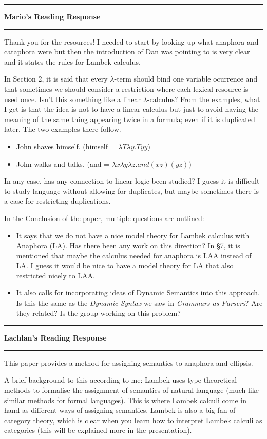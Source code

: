 \documentclass{amsart}
\newcommand{\iam}[1]{
  \vspace{0.25em}
  \hrule
  \vspace{0.25em}
  \textbf{{#1}'s Reading Response}
  \vspace{0.25em}
  \hrule
  \vspace{1em}
}
\begin{document}
\iam{Mario}
Thank you for the resources! I needed to start by looking up what
anaphora and cataphora were but then the introduction of
\cite{PentusGrammars} Dan was pointing to is very clear and it
states the rules for Lambek calculus.

In Section 2, it is said that every $\lambda\mbox{-term}$ should bind one variable
ocurrence and that sometimes we should consider a restriction where
each lexical resource is used once. Isn't this something like a linear
$\lambda\mbox{-calculus}$? From the examples, what I get is that the idea is
not to have a linear calculus but just to avoid having the meaning of
the same thing appearing twice in a formula; even if it is duplicated
later. The two examples there follow.

\begin{itemize}
\item John shaves himself. (himself = $\lambda T \lambda y. T y y$)
\item John walks and talks. (and = $\lambda x \lambda y \lambda z . and(xz)(yz)$)
\end{itemize}

In any case, has any connection to linear logic been studied?  I guess
it is difficult to study language without allowing for duplicates, but
maybe sometimes there is a case for restricting duplications.

In the Conclusion of the paper, multiple questions are outlined:

\begin{itemize}
\item It says that we do not have a nice model theory
  for Lambek calculus with Anaphora (LA).  Has there been any work on
  this direction?  In \S 7, it is mentioned that maybe the calculus
  needed for anaphora is LAA instead of LA\@. I guess it would be nice to
  have a model theory for LA that also restricted nicely to LAA.

\item It also calls for incorporating ideas of Dynamic Semantics
  into this approach. Is this the same as the \emph{Dynamic Syntax} we
  saw in \emph{Grammars as Parsers}? Are they related? Is the group
  working on this problem?
\end{itemize}

\iam{Lachlan}
This paper provides a method for assigning semantics to anaphora and ellipsis.

A brief background to this according to me:
Lambek uses type-theoretical methods to formalise the assignment of semantics of natural language (much like similar methods for formal languages). This is where Lambek calculi come in hand as different ways of assigning semantics. Lambek is also a big fan of category theory, which is clear when you learn how to interpret Lambek calculi as categories (this will be explained more in the presentation).
\end{document}
